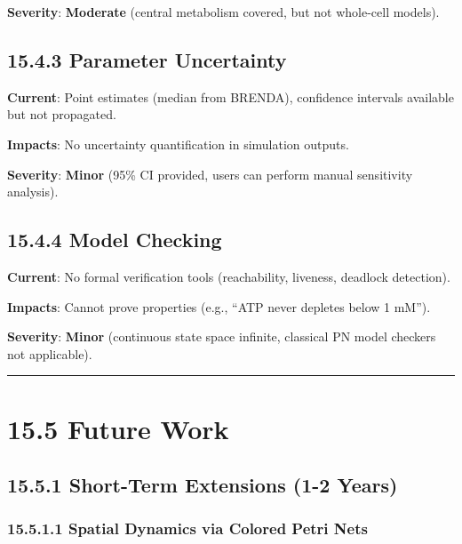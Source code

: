\textbf{Severity}: \textbf{Moderate} (central metabolism covered, but
not whole-cell models).

\hypertarget{parameter-uncertainty}{%
\subsection{15.4.3 Parameter Uncertainty}\label{parameter-uncertainty}}

\textbf{Current}: Point estimates (median from BRENDA), confidence
intervals available but not propagated.

\textbf{Impacts}: No uncertainty quantification in simulation outputs.

\textbf{Severity}: \textbf{Minor} (95\% CI provided, users can perform
manual sensitivity analysis).

\hypertarget{model-checking}{%
\subsection{15.4.4 Model Checking}\label{model-checking}}

\textbf{Current}: No formal verification tools (reachability, liveness,
deadlock detection).

\textbf{Impacts}: Cannot prove properties (e.g., ``ATP never depletes
below 1 mM'').

\textbf{Severity}: \textbf{Minor} (continuous state space infinite,
classical PN model checkers not applicable).

\begin{center}\rule{0.5\linewidth}{0.5pt}\end{center}

\hypertarget{future-work}{%
\section{15.5 Future Work}\label{future-work}}

\hypertarget{short-term-extensions-1-2-years}{%
\subsection{15.5.1 Short-Term Extensions (1-2
Years)}\label{short-term-extensions-1-2-years}}

\hypertarget{spatial-dynamics-via-colored-petri-nets}{%
\subsubsection{15.5.1.1 Spatial Dynamics via Colored Petri
Nets}\label{spatial-dynamics-via-colored-petri-nets}}

